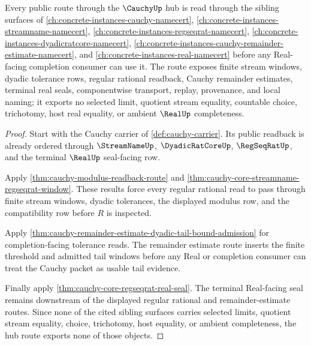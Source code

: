 \begin{theorem}
\label{thm:cauchy-seed-closure-route}
Every public route through the $\CauchyUp$ hub is read through the sibling surfaces of \autoref{ch:concrete-instances-cauchy-namecert}, \autoref{ch:concrete-instances-streamname-namecert}, \autoref{ch:concrete-instances-regseqrat-namecert}, \autoref{ch:concrete-instances-dyadicratcore-namecert}, \autoref{ch:concrete-instances-cauchy-remainder-estimate-namecert}, and \autoref{ch:concrete-instances-real-namecert} before any Real-facing completion consumer can use it. The route exposes finite stream windows, dyadic tolerance rows, regular rational readback, Cauchy remainder estimates, terminal real seals, componentwise transport, replay, provenance, and local naming; it exports no selected limit, quotient stream equality, countable choice, trichotomy, host real equality, or ambient $\RealUp$ completeness.
\end{theorem}
\begin{proof}
Start with the Cauchy carrier of \autoref{def:cauchy-carrier}. Its public readback is already ordered through $\StreamNameUp$, $\DyadicRatCoreUp$, $\RegSeqRatUp$, and the terminal $\RealUp$ seal-facing row.

Apply \autoref{thm:cauchy-modulus-readback-route} and \autoref{thm:cauchy-core-streamname-regseqrat-window}. These results force every regular rational read to pass through finite stream windows, dyadic tolerances, the displayed modulus row, and the compatibility row before $R$ is inspected.

Apply \autoref{thm:cauchy-remainder-estimate-dyadic-tail-bound-admission} for completion-facing tolerance reads. The remainder estimate route inserts the finite threshold and admitted tail windows before any Real or completion consumer can treat the Cauchy packet as usable tail evidence.

Finally apply \autoref{thm:cauchy-core-regseqrat-real-seal}. The terminal Real-facing seal remains downstream of the displayed regular rational and remainder-estimate routes. Since none of the cited sibling surfaces carries selected limits, quotient stream equality, choice, trichotomy, host equality, or ambient completeness, the hub route exports none of those objects.
\end{proof}

